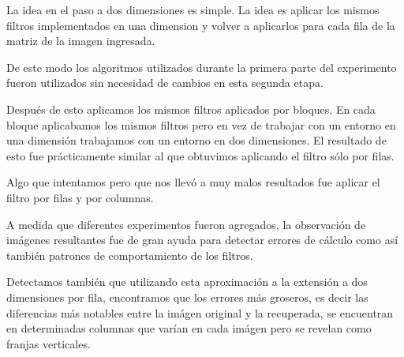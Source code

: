 La idea en el paso a dos dimensiones es simple. La idea es aplicar los mismos
filtros implementados en una dimension y volver a aplicarlos para cada fila de
la matriz de la imagen ingresada.

De este modo los algoritmos utilizados durante la primera parte del experimento
fueron utilizados sin necesidad de cambios en esta segunda etapa.

Despu\'es de esto aplicamos los mismos filtros aplicados por bloques. En cada bloque
aplicabamos los mismos filtros pero en vez de trabajar con un entorno en una dimensi\'on
trabajamos con un entorno en dos dimensiones. El resultado de esto fue pr\'acticamente similar
al que obtuvimos aplicando el filtro s\'olo por filas.

Algo que intentamos pero que nos llev\'o a muy malos resultados fue aplicar el filtro por filas y por columnas.

A medida que diferentes experimentos fueron agregados, la observaci\'on de
im\'agenes resultantes fue de gran ayuda para detectar errores de c\'alculo como
as\'i tambi\'en patrones de comportamiento de los filtros.

Detectamos tambi\'en que utilizando esta aproximaci\'on a la extensi\'on a dos
dimensiones por fila, encontramos que los errores m\'as groseros, es decir las
diferencias m\'as notables entre la im\'agen original y la recuperada, se
encuentran en determinadas columnas que var\'ian en cada im\'agen pero se
revelan como franjas verticales.
